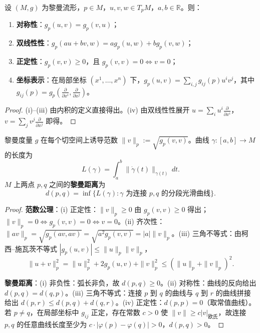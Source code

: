 \begin{property}[黎曼度量的基本性质]\label{prop:riemannian_metric_properties}
设 $(M, g)$ 为黎曼流形，$p \in M$，$u, v, w \in T_pM$，$a, b \in \mathbb{R}$。则：
\begin{enumerate}[label=(\roman*)]
    \item \textbf{对称性}：$g_p(u, v) = g_p(v, u)$；
    \item \textbf{双线性性}：$g_p(au + bv, w) = a g_p(u, w) + b g_p(v, w)$；
    \item \textbf{正定性}：$g_p(v, v) \ge 0$，且 $g_p(v, v) = 0 \iff v = 0$；
    \item \textbf{坐标表示}：在局部坐标 $(x^1, \dots, x^n)$ 下，$g_p(u, v) = \sum_{i,j} g_{ij}(p) u^i v^j$，其中 $g_{ij}(p) = g_p(\frac{\partial}{\partial x^i}, \frac{\partial}{\partial x^j})$。
\end{enumerate}
\end{property}

\begin{proof}
(i)–(iii) 由内积的定义直接得出。(iv) 由双线性性展开 $u = \sum_i u^i \frac{\partial}{\partial x^i}$，$v = \sum_j v^j \frac{\partial}{\partial x^j}$ 即得。
\end{proof}

\begin{proposition}[黎曼度量诱导的范数与距离]\label{prop:metric_norm}
黎曼度量 $g$ 在每个切空间上诱导范数 $\|v\|_p := \sqrt{g_p(v,v)}$。曲线 $\gamma: [a,b] \to M$ 的长度为
\[
L(\gamma) = \int_a^b \|\dot{\gamma}(t)\|_{\gamma(t)}\, dt.
\]
$M$ 上两点 $p, q$ 之间的\textbf{黎曼距离}为
\[
d(p,q) = \inf\{L(\gamma) : \gamma \text{ 为连接 } p, q \text{ 的分段光滑曲线}\}.
\]
\end{proposition}

\begin{proof}
\textbf{范数公理}：(i) 正定性：$\|v\|_p \ge 0$ 由 $g_p(v,v) \ge 0$ 得出；$\|v\|_p = 0 \iff g_p(v,v) = 0 \iff v = 0$。(ii) 齐次性：$\|av\|_p = \sqrt{g_p(av,av)} = \sqrt{a^2 g_p(v,v)} = |a|\|v\|_p$。(iii) 三角不等式：由柯西–施瓦茨不等式 $|g_p(u,v)| \le \|u\|_p \|v\|_p$，
\[
\|u+v\|_p^2 = \|u\|_p^2 + 2g_p(u,v) + \|v\|_p^2 \le (\|u\|_p + \|v\|_p)^2.
\]

\textbf{黎曼距离}：(i) 非负性：弧长非负，故 $d(p,q)\ge0$。(ii) 对称性：曲线的反向给出 $d(p,q) = d(q,p)$。(iii) 三角不等式：连接 $p$ 到 $q$ 的曲线与 $q$ 到 $r$ 的曲线拼接给出 $d(p,r) \le d(p,q) + d(q,r)$。(iv) 正定性：$d(p,p) = 0$（取常值曲线）。若 $p \neq q$，在局部坐标中 $g_{ij}$ 正定，存在常数 $c > 0$ 使 $\|v\| \ge c |v|_{\text{欧氏}}$，故连接 $p, q$ 的任意曲线长度至少为 $c \cdot |\varphi(p) - \varphi(q)| > 0$，$d(p,q) > 0$。
\end{proof}

